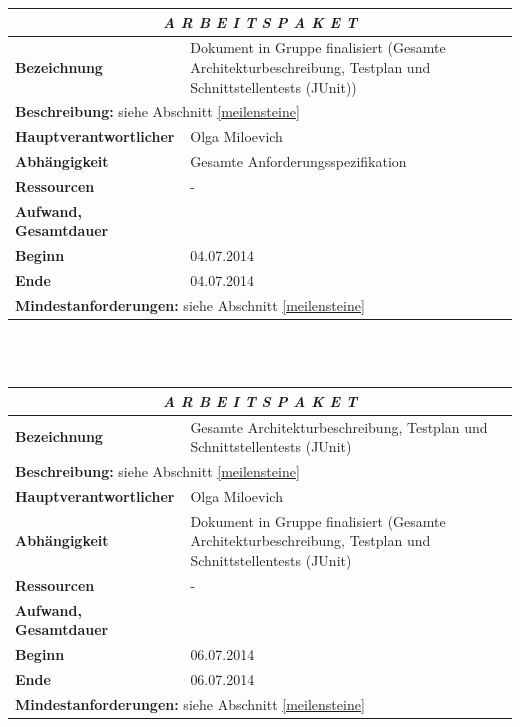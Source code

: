 \documentclass[fontsize=12pt,paper=a4,twoside]{scrartcl}
\begin{document}
\begin{tabular}{p{7.5cm}|p{7.5cm}}\toprule
\multicolumn{2}{c}{\textbf{\textit{A R B E I T S P A K E T \quad 5.5}}} \\ \toprule \hline
\textbf{Bezeichnung} & Dokument in Gruppe finalisiert (Gesamte Architekturbeschreibung, Testplan und Schnittstellentests (JUnit))\\\hline
\multicolumn{2}{p{15cm}}{\textbf{Beschreibung:} \newline 
siehe Abschnitt \ref{meilensteine} }  \\\hline
\textbf{Hauptverantwortlicher} & Olga Miloevich \\\hline
\textbf{Abhängigkeit} & Gesamte Anforderungsspezifikation
\\\hline
\textbf{Ressourcen} & -\\\hline
\textbf{Aufwand, Gesamtdauer} & \\\hline
\textbf{Beginn} & 04.07.2014 \\\hline
\textbf{Ende} & 04.07.2014\\\hline
\multicolumn{2}{p{15cm}}{\textbf{Mindestanforderungen: } \newline
siehe Abschnitt \ref{meilensteine}}  \\ \toprule
\end{tabular} \\\\

\begin{tabular}{p{7.5cm}|p{7.5cm}}\toprule
\multicolumn{2}{c}{\textbf{\textit{A R B E I T S P A K E T \quad 5.6}}} \\ \toprule \hline
\textbf{Bezeichnung} & Gesamte Architekturbeschreibung, Testplan und Schnittstellentests (JUnit)\\\hline
\multicolumn{2}{p{15cm}}{\textbf{Beschreibung:} \newline 
siehe Abschnitt \ref{meilensteine} }  \\\hline
\textbf{Hauptverantwortlicher} & Olga Miloevich \\\hline
\textbf{Abhängigkeit} & Dokument in Gruppe finalisiert (Gesamte Architekturbeschreibung, Testplan und Schnittstellentests (JUnit)\\\hline
\textbf{Ressourcen} & -\\\hline
\textbf{Aufwand, Gesamtdauer} & \\\hline
\textbf{Beginn} & 06.07.2014 \\\hline
\textbf{Ende} & 06.07.2014\\\hline
\multicolumn{2}{p{15cm}}{\textbf{Mindestanforderungen: } \newline
siehe Abschnitt \ref{meilensteine}}  \\ \toprule
\end{tabular} \\\\
\end{document}

